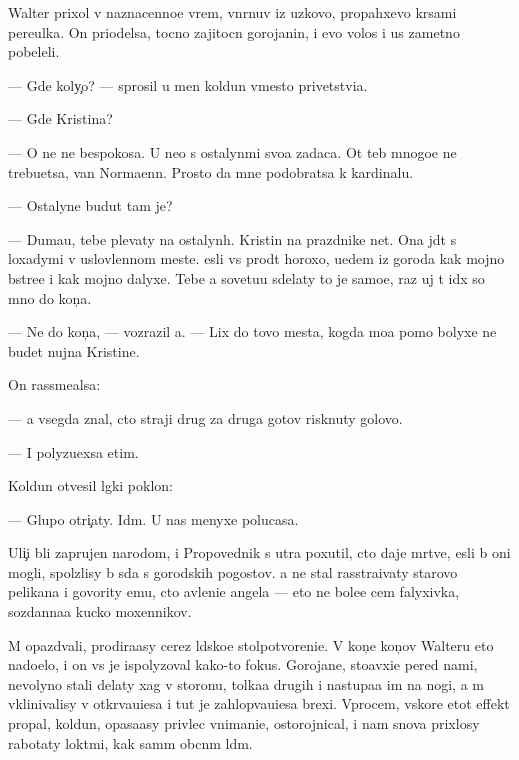 \documentclass[10pt]{book}
\begin{document}
Walter prixol v naznacenno{\y}e vrem{\ia}, v{\yi}n{\yi}rnuv iz uzkovo, propahxevo kr{\yi}sami pereulka. On priodelsa, tocno zajitocn{\yi}{\y} gorojanin, i {\y}evo volos{\yi} i us{\yi} zametno pobeleli.

— Gde koly{\c}o? — sprosil u men{\ia} koldun vmesto privetstvi{\y}a.

— Gde Kristina?

— O ne{\y} ne bespoko{\y}sa. U ne{\y}o s ostalyn{\yi}mi svo{\y}a zadaca. Ot teb{\ia} mnogo{\y}e ne trebu{\y}etsa, van Normaenn. Prosto da{\y} mne podobratsa k kardinalu.

— Ostalyn{\yi}{\y}e budut tam je?

— Duma{\y}u, tebe plevaty na ostalyn{\yi}h. Kristin{\yi} na prazdnike net. Ona jd{\e}t s loxadymi v uslovlennom meste. {\Y}esli vs{\e} pro{\y}d{\e}t horoxo, u{\y}edem iz goroda kak mojno b{\yi}stre{\y}e i kak mojno dalyxe. Tebe {\y}a sovetu{\y}u sdelaty to je samo{\y}e, raz uj t{\yi} id{\e}x so mno{\y} do kon{\c}a.

— Ne do kon{\c}a, — vozrazil {\y}a. — Lix do tovo mesta, kogda mo{\y}a pomo{\x} bolyxe ne budet nujna Kristine.

On rassme{\y}alsa:

— {\Y}a vsegda znal, cto straji drug za druga gotov{\yi} risknuty golovo{\y}.

— I polyzu{\y}exsa etim.

Koldun otvesil l{\e}gki{\y} poklon:

— Glupo otri{\c}aty. Id{\e}m. U nas menyxe polucasa.

Uli{\c}i b{\yi}li zaprujen{\yi} narodom, i Propovednik s utra poxutil, cto daje m{\e}rtv{\yi}{\y}e, {\y}esli b{\yi} oni mogli, spolzlisy b{\yi} s{\iu}da s gorodskih pogostov. {\Y}a ne stal rasstra{\y}ivaty starovo pelikana i govority {\y}emu, cto {\y}avleni{\y}e angela — eto ne bole{\y}e cem falyxivka, sozdanna{\y}a kucko{\y} moxennikov.

M{\yi} opazd{\yi}vali, prodira{\y}asy cerez l{\iu}dsko{\y}e stolpotvoreni{\y}e. V kon{\c}e kon{\c}ov Walteru eto nado{\y}elo, i on vs{\e} je ispolyzoval kako{\y}-to fokus. Gorojane, sto{\y}avxi{\y}e pered nami, nevolyno stali delaty xag v storonu, tolka{\y}a drugih i nastupa{\y}a im na nogi, a m{\yi} vklinivalisy v otkr{\yi}va{\y}u{\x}i{\y}esa i tut je zahlop{\yi}va{\y}u{\x}i{\y}esa brexi. Vprocem, vskore etot effekt propal, koldun, opasa{\y}asy privlec vnimani{\y}e, ostorojnical, i nam snova prixlosy rabotaty lokt{\ia}mi, kak sam{\yi}m ob{\yi}cn{\yi}m l{\iu}d{\ia}m.
\end{document}
